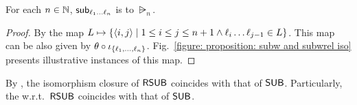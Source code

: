 
\begin{proposition}\label{proposition: subw and subwrel iso}
    For each $n \in \mathbb{N}$, $\mathsf{sub}_{\ell_1 \dots \ell_{n}}$ is  to $\rsub_n$.
\end{proposition}
\begin{proof}
    By the map $L \mapsto \{\langle i,j\rangle \mid 1 \le i \le j \le n+1 \land \ell_{i} \dots \ell_{j-1} \in L\}$.
    This map can be also given by $\theta \circ \iota_{\{\ell_1, \dots, \ell_{n}\}}$.
    Fig.\ \ref{figure: proposition: subw and subwrel iso} presents illustrative instances of this map.
\end{proof}
By , the isomorphism closure of $\mathsf{RSUB}$ coincides with that of $\mathsf{SUB}$.
Particularly, the  w.r.t.\ $\mathsf{RSUB}$ coincides with that of $\mathsf{SUB}$.

